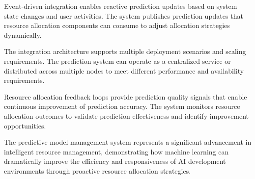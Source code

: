 Event-driven integration enables reactive prediction updates based on system state changes and user activities. The system publishes prediction updates that resource allocation components can consume to adjust allocation strategies dynamically.

The integration architecture supports multiple deployment scenarios and scaling requirements. The prediction system can operate as a centralized service or distributed across multiple nodes to meet different performance and availability requirements.

Resource allocation feedback loops provide prediction quality signals that enable continuous improvement of prediction accuracy. The system monitors resource allocation outcomes to validate prediction effectiveness and identify improvement opportunities.

The predictive model management system represents a significant advancement in intelligent resource management, demonstrating how machine learning can dramatically improve the efficiency and responsiveness of AI development environments through proactive resource allocation strategies.
